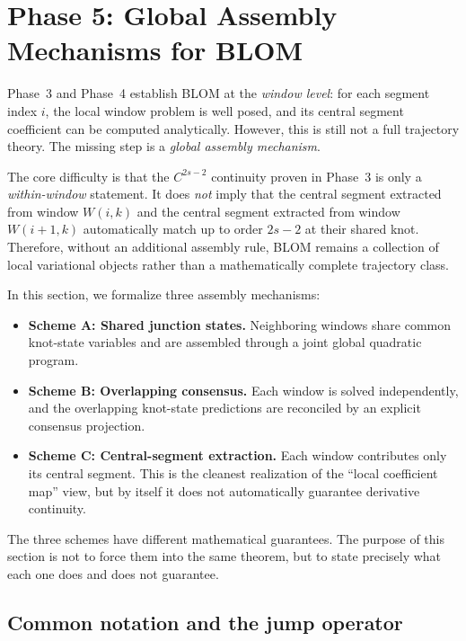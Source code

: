 \section{Phase 5: Global Assembly Mechanisms for BLOM}
\label{sec:phase5_global_assembly}

Phase~3 and Phase~4 establish BLOM at the \emph{window level}:
for each segment index \(i\), the local window problem is well posed, and its central segment coefficient can be computed analytically.
However, this is still not a full trajectory theory.
The missing step is a \emph{global assembly mechanism}.

The core difficulty is that the \(C^{2s-2}\) continuity proven in Phase~3 is only a \emph{within-window} statement.
It does \emph{not} imply that the central segment extracted from window \(W(i,k)\) and the central segment extracted from window \(W(i+1,k)\) automatically match up to order \(2s-2\) at their shared knot.
Therefore, without an additional assembly rule, BLOM remains a collection of local variational objects rather than a mathematically complete trajectory class.

In this section, we formalize three assembly mechanisms:

\begin{itemize}
    \item \textbf{Scheme A: Shared junction states.}
    Neighboring windows share common knot-state variables and are assembled through a joint global quadratic program.
    \item \textbf{Scheme B: Overlapping consensus.}
    Each window is solved independently, and the overlapping knot-state predictions are reconciled by an explicit consensus projection.
    \item \textbf{Scheme C: Central-segment extraction.}
    Each window contributes only its central segment.
    This is the cleanest realization of the ``local coefficient map'' view, but by itself it does not automatically guarantee derivative continuity.
\end{itemize}

The three schemes have different mathematical guarantees.
The purpose of this section is not to force them into the same theorem, but to state precisely what each one does and does not guarantee.

\subsection{Common notation and the jump operator}
\label{subsec:phase5_common_notation}

